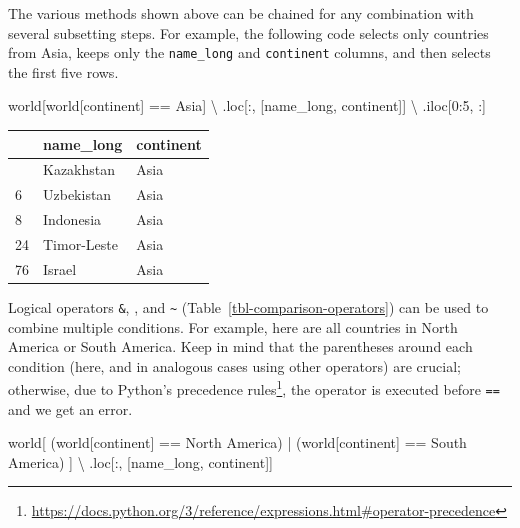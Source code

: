 \documentclass[
  letterpaper,
]{krantz}
\newenvironment{Shaded}{\begin{snugshade}}{\end{snugshade}}
\newcommand{\DecValTok}[1]{\textcolor[rgb]{0.68,0.00,0.00}{#1}}
\newcommand{\NormalTok}[1]{\textcolor[rgb]{0.00,0.23,0.31}{#1}}
\newcommand{\OperatorTok}[1]{\textcolor[rgb]{0.37,0.37,0.37}{#1}}
\newcommand{\StringTok}[1]{\textcolor[rgb]{0.13,0.47,0.30}{#1}}
\begin{document}
The various methods shown above can be chained for any combination with
several subsetting steps. For example, the following code selects only
countries from Asia, keeps only the \texttt{name\_long} and
\texttt{continent} columns, and then selects the first five rows.

\begin{Shaded}
\begin{Highlighting}[]
\NormalTok{world[world[}\StringTok{\textquotesingle{}continent\textquotesingle{}}\NormalTok{] }\OperatorTok{==} \StringTok{\textquotesingle{}Asia\textquotesingle{}}\NormalTok{]  }\OperatorTok{\textbackslash{}}
\NormalTok{    .loc[:, [}\StringTok{\textquotesingle{}name\_long\textquotesingle{}}\NormalTok{, }\StringTok{\textquotesingle{}continent\textquotesingle{}}\NormalTok{]]  }\OperatorTok{\textbackslash{}}
\NormalTok{    .iloc[}\DecValTok{0}\NormalTok{:}\DecValTok{5}\NormalTok{, :]}
\end{Highlighting}
\end{Shaded}

\begin{longtable}[]{@{}lll@{}}
\toprule\noalign{}
& name\_long & continent \\
\midrule\noalign{}
\endhead
\bottomrule\noalign{}
\endlastfoot
5 & Kazakhstan & Asia \\
6 & Uzbekistan & Asia \\
8 & Indonesia & Asia \\
24 & Timor-Leste & Asia \\
76 & Israel & Asia \\
\end{longtable}

Logical operators \texttt{\&}, \texttt{\textbar{}}, and
\texttt{\textasciitilde{}} (Table~\ref{tbl-comparison-operators}) can be
used to combine multiple conditions. For example, here are all countries
in North America or South America. Keep in mind that the parentheses
around each condition (here, and in analogous cases using other
operators) are crucial; otherwise, due to Python's precedence
rules\footnote{\url{https://docs.python.org/3/reference/expressions.html\#operator-precedence}},
the \texttt{\textbar{}} operator is executed before \texttt{==} and we
get an error.

\begin{Shaded}
\begin{Highlighting}[]
\NormalTok{world[}
\NormalTok{        (world[}\StringTok{\textquotesingle{}continent\textquotesingle{}}\NormalTok{] }\OperatorTok{==} \StringTok{\textquotesingle{}North America\textquotesingle{}}\NormalTok{) }\OperatorTok{|} 
\NormalTok{        (world[}\StringTok{\textquotesingle{}continent\textquotesingle{}}\NormalTok{] }\OperatorTok{==}  \StringTok{\textquotesingle{}South America\textquotesingle{}}\NormalTok{)}
\NormalTok{    ]  }\OperatorTok{\textbackslash{}}
\NormalTok{    .loc[:, [}\StringTok{\textquotesingle{}name\_long\textquotesingle{}}\NormalTok{, }\StringTok{\textquotesingle{}continent\textquotesingle{}}\NormalTok{]]}
\end{Highlighting}
\end{Shaded}
\end{document}

